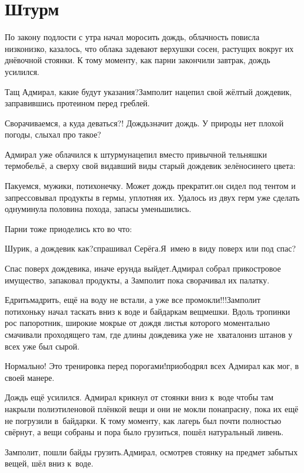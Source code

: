 \chapter{Штурм}
\vepsianrose

По закону подлости с утра начал моросить дождь, облачность повисла низко\sdash низко, казалось, что облака задевают верхушки сосен, растущих вокруг их днёвочной стоянки. К тому моменту, как парни закончили завтрак, дождь усилился.

\diagdash Тащ Адмирал, какие будут указания?\mdash Замполит нацепил свой жёлтый дождевик, заправившись протеином перед греблей.

\diagdash Сворачиваемся, а куда деваться?! Дождь\mdash значит дождь. У природы нет плохой погоды, слыхал про такое?

Адмирал уже облачился к штурму\mdash нацепил вместо привычной тельняшки термобельё, а сверху свой видавший виды старый дождевик зелёно\sdash синего цвета:

\diagdash Пакуемся, мужики, потихонечку. Может дождь прекратит.\mdash он сидел под тентом и запрессовывал продукты в гермы, уплотняя их. Удалось из двух герм уже сделать одну\mdash минула половина похода, запасы уменьшились.

Парни тоже приоделись кто во что: 

\diagdash Шурик, а дождевик как?\mdash спрашивал Серёга.\mdash Я~имею в виду поверх или под спас?

\diagdash Спас поверх дождевика, иначе ерунда выйдет.\mdash Адмирал собрал прикостровое имущество, запаковал продукты, а Замполит пока сворачивал их палатку.

\diagdash Едрить\sdash мадрить, ещё на воду не встали, а уже все промокли!!!\mdash Замполит потихоньку начал таскать вниз к воде и байдаркам вещмешки. Вдоль тропинки рос папоротник, широкие мокрые от дождя листья которого моментально смачивали проходящего там, где длины дождевика уже не~хватало\mdash низ штанов у всех уже был сырой.

\diagdash Нормально! Это тренировка перед порогами!\mdash приободрял всех Адмирал как мог, в своей манере.

Дождь ещё усилился. Адмирал крикнул от стоянки вниз к~воде чтобы там накрыли полиэтиленовой плёнкой вещи и они не мокли понапрасну, пока их ещё не погрузили в~байдарки. К тому моменту, как лагерь был почти полностью свёрнут, а вещи собраны и пора было грузиться, пошёл натуральный ливень.

\diagdash Замполит, пошли байды грузить.\mdash Адмирал, осмотрев стоянку на предмет забытых вещей, шёл вниз к~воде.

